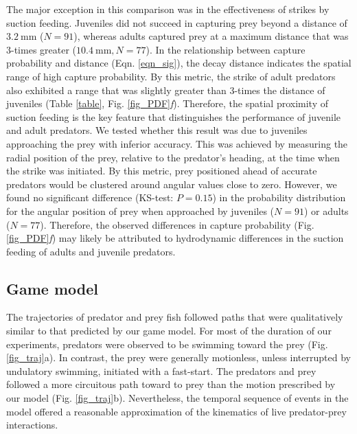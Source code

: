 \documentclass[]{rsos}%
\begin{document}
The major exception in this comparison was in the effectiveness of strikes by suction feeding.
Juveniles did not succeed in capturing prey beyond a distance of $\SI{3.2}{\mm}$ ($N = 91$), whereas adults captured prey at a maximum distance that was 3-times greater ($\SI{10.4}{\mm}, N = 77$).
In the relationship between capture probability and distance (Eqn. \ref{eqn_sig}), the decay distance indicates the spatial range of high capture probability. 
By this metric, the strike of adult predators also exhibited a range that was slightly greater than 3-times the distance of juveniles (Table \ref{table}, Fig. \ref{fig_PDF}\textit{f}).
Therefore, the spatial proximity of suction feeding is the key feature that distinguishes the performance of juvenile and adult predators.
We tested whether this result was due to juveniles approaching the prey with inferior accuracy.
This was achieved by measuring the radial position of the prey, relative to the predator's heading, at the time when the strike was initiated.
By this metric, prey positioned ahead of accurate predators would be clustered around angular values close to zero. 
However, we found no significant difference (KS-test: $P = 0.15$) in the probability distribution for the angular position of prey when approached by juveniles ($N = 91$) or adults ($N = 77$).
Therefore, the observed differences in capture probability (Fig. \ref{fig_PDF}\textit{f}) may likely be attributed to hydrodynamic differences in the suction feeding of adults and juvenile predators.


\subsection{Game model} %
The trajectories of predator and prey fish followed paths that were qualitatively similar to that predicted by our game model.
For most of the duration of our experiments, predators were observed to be swimming toward the prey (Fig. \ref{fig_traj}a). 
In contrast, the prey were generally motionless, unless interrupted by undulatory swimming, initiated with a fast-start.
The predators and prey followed a more circuitous path toward to prey than the motion prescribed by our model (Fig. \ref{fig_traj}b).
Nevertheless, the temporal sequence of events in the model offered a reasonable approximation of the kinematics of live predator-prey interactions.
\end{document}
